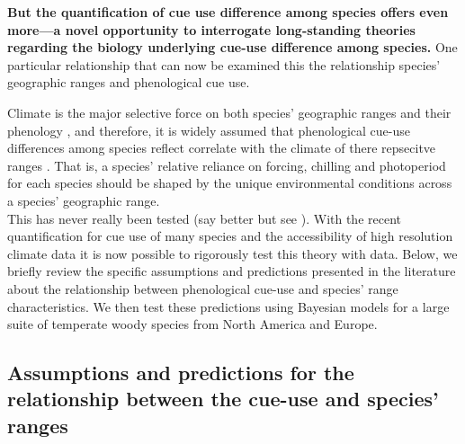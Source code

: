 \documentclass[11pt]{article}\usepackage[]{graphicx}\usepackage[]{color}
\begin{document}
\textbf{ But the quantification of cue use difference among species offers even more---a novel opportunity to interrogate long-standing theories regarding the biology underlying cue-use difference among species.} One particular relationship that can now be examined this the relationship species' geographic ranges and phenological cue use.

Climate is the major selective force on both species' geographic ranges \citep{} and their phenology \citep{}, and therefore, it is widely assumed that phenological cue-use differences among species reflect correlate with the climate of there repsecitve ranges \citep{}. That is, a species' relative reliance on forcing, chilling and photoperiod for each species should be shaped by the unique environmental conditions across a species' geographic range.\\

This has never really been tested (say better but see \citep{Zohner:2017aa}). With the recent quantification for cue use of many species \citep{} and the accessibility of high resolution climate data it is now possible to rigorously test this theory with data. Below, we briefly review the specific assumptions and predictions presented in the literature about the relationship between phenological cue-use and species' range characteristics. We then test these predictions using Bayesian models for a large suite of temperate woody species from North America and Europe.


\subsection*{Assumptions and predictions for the relationship between the cue-use and species' ranges}
\end{document}
